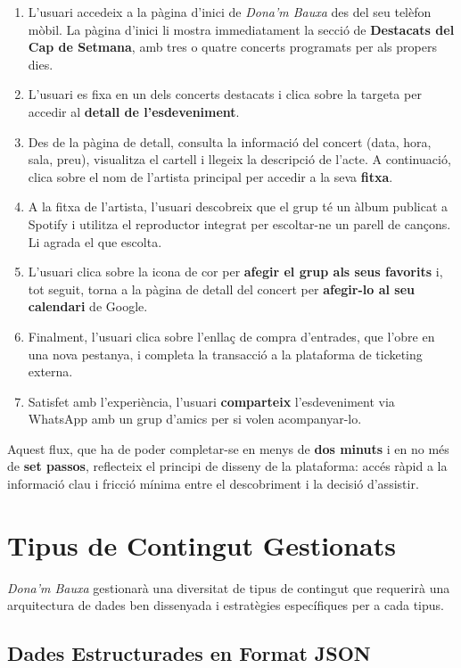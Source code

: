 \begin{enumerate}
    \item L'usuari accedeix a la pàgina d'inici de \textit{Dona'm Bauxa} des del seu telèfon mòbil. La pàgina d'inici li mostra immediatament la secció de \textbf{Destacats del Cap de Setmana}, amb tres o quatre concerts programats per als propers dies.
    \item L'usuari es fixa en un dels concerts destacats i clica sobre la targeta per accedir al \textbf{detall de l'esdeveniment}.
    \item Des de la pàgina de detall, consulta la informació del concert (data, hora, sala, preu), visualitza el cartell i llegeix la descripció de l'acte. A continuació, clica sobre el nom de l'artista principal per accedir a la seva \textbf{fitxa}.
    \item A la fitxa de l'artista, l'usuari descobreix que el grup té un àlbum publicat a Spotify i utilitza el reproductor integrat per escoltar-ne un parell de cançons. Li agrada el que escolta.
    \item L'usuari clica sobre la icona de cor per \textbf{afegir el grup als seus favorits} i, tot seguit, torna a la pàgina de detall del concert per \textbf{afegir-lo al seu calendari} de Google.
    \item Finalment, l'usuari clica sobre l'enllaç de compra d'entrades, que l'obre en una nova pestanya, i completa la transacció a la plataforma de ticketing externa.
    \item Satisfet amb l'experiència, l'usuari \textbf{comparteix} l'esdeveniment via WhatsApp amb un grup d'amics per si volen acompanyar-lo.
\end{enumerate}

Aquest flux, que ha de poder completar-se en menys de \textbf{dos minuts} i en no més de \textbf{set passos}, reflecteix el principi de disseny de la plataforma: accés ràpid a la informació clau i fricció mínima entre el descobriment i la decisió d'assistir.

\section{Tipus de Contingut Gestionats}

\textit{Dona'm Bauxa} gestionarà una diversitat de tipus de contingut que requerirà una arquitectura de dades ben dissenyada i estratègies específiques per a cada tipus.

\subsection{Dades Estructurades en Format JSON}

